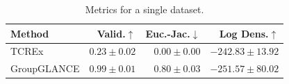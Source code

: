 \begin{table}[h]
\centering
\caption{Metrics for a single dataset.}
\label{tab:single_dataset_metrics}
\begin{center}
\begin{sc}
\begin{scriptsize}
\begin{tabular}{l|rrr}
\toprule
Method & Valid.$\uparrow$ & Euc.-Jac.$\downarrow$ & Log Dens.$\uparrow$ \\
\midrule
TCREx & $0.23\pm{0.02}$ & $\boldsymbol{0.00\pm{0.00}}$ & $\boldsymbol{-242.83\pm{13.92}}$ \\
GroupGLANCE & $\boldsymbol{0.99\pm{0.01}}$ & $0.80\pm{0.03}$ & $-251.57\pm{80.02}$ \\
\bottomrule
\end{tabular}
\end{scriptsize}
\end{sc}
\end{center}
\end{table}
